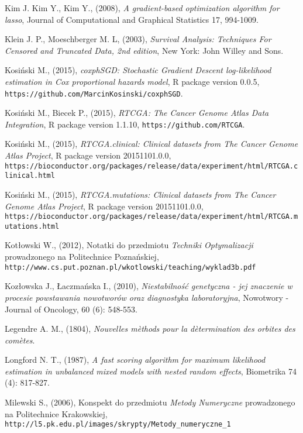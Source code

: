 \begin{thebibliography}{99}
 Kim J. Kim Y., Kim Y., (2008), \textit{A gradient-based optimization algorithm for lasso},  Journal of Computational and Graphical Statistics 17, 994-1009.

 Klein J. P., Moeschberger M. L, (2003), \textit{Survival Analysis: Techniques For Censored and Truncated Data, 2nd edition}, New York: John Willey and Sons.



 Kosiński M., (2015), \textit{coxphSGD: Stochastic Gradient Descent log-likelihood estimation in Cox proportional hazards model}, R package version 0.0.5,  \texttt{https://github.com/MarcinKosinski/coxphSGD}.

 Kosiński M., Biecek P., (2015), \textit{RTCGA: The Cancer Genome Atlas Data Integration}, R package version 1.1.10, \texttt{https://github.com/RTCGA}.

 Kosiński M., (2015), \textit{RTCGA.clinical: Clinical datasets from The Cancer Genome Atlas Project}, R package version 20151101.0.0, \\ \texttt{https://bioconductor.org/packages/release/data/experiment/html/RTCGA.clinical.html}

 Kosiński M., (2015), \textit{RTCGA.mutations: Clinical datasets from The Cancer Genome Atlas Project}, R package version 20151101.0.0, \\ \texttt{https://bioconductor.org/packages/release/data/experiment/html/RTCGA.mutations.html}

 Kotłowski W., (2012), Notatki do przedmiotu \textit{Techniki Optymalizacji} prowadzonego na Politechnice Poznańskiej, \\ \texttt{http://www.cs.put.poznan.pl/wkotlowski/teaching/wyklad3b.pdf}

 Kozłowska J., Łaczmańska I., (2010), \textit{Niestabilność genetyczna - jej znaczenie w procesie powstawania nowotworów oraz diagnostyka laboratoryjna}, Nowotwory - Journal of Oncology, 60 (6): 548-553.

 Legendre A. M., (1804), \textit{Nouvelles m\`ethods pour la d\`etermination des orbites des com\`etes}.


 Longford N. T., (1987), \textit{A fast scoring algorithm for maximum likelihood estimation in unbalanced mixed models with nested random effects}, Biometrika 74 (4): 817-827.

 Milewski S., (2006), Konspekt do przedmiotu \textit{Metody Numeryczne} prowadzonego na Politechnice Krakowskiej, \\ \texttt{http://l5.pk.edu.pl/images/skrypty/Metody\_numeryczne\_1}


\end{thebibliography}
